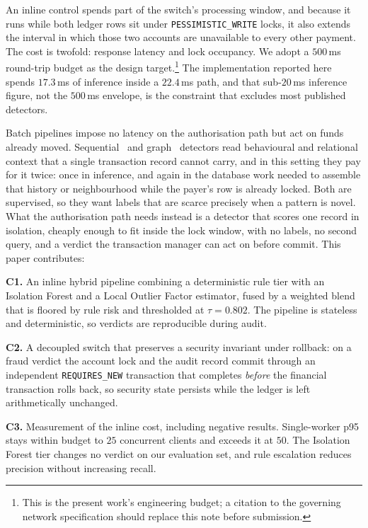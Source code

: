 \documentclass[conference]{IEEEtran}
\begin{document}
An inline control spends part of the switch's processing window, and
because it runs while both ledger rows sit under
\texttt{PESSIMISTIC\_WRITE} locks, it also extends the interval in
which those two accounts are unavailable to every other payment. The
cost is twofold: response latency and lock occupancy. We adopt a
$500$\,ms round-trip budget as the design
target.\footnote{This is the present work's engineering
budget; a citation to the governing network specification should
replace this note before submission.} The implementation reported here
spends $17.3$\,ms of inference inside a $22.4$\,ms path, and that
sub-$20$\,ms inference figure, not the $500$\,ms envelope, is the
constraint that excludes most published detectors.

Batch pipelines impose no latency on the authorisation path but act on
funds already moved. Sequential~\cite{jurgovsky2018} and
graph~\cite{dou2020} detectors read behavioural and relational context
that a single transaction record cannot carry, and in this setting they
pay for it twice: once in inference, and again in the database work
needed to assemble that history or neighbourhood while the payer's row
is already locked. Both are supervised, so they want labels that are
scarce precisely when a pattern is novel. What the authorisation path
needs instead is a detector that scores one record in isolation,
cheaply enough to fit inside the lock window, with no labels, no second
query, and a verdict the transaction manager can act on before commit.
This paper contributes:

\textbf{C1.} An inline hybrid pipeline combining a deterministic rule
tier with an Isolation Forest and a Local Outlier Factor estimator,
fused by a weighted blend that is floored by rule risk and thresholded
at $\tau=0.802$. The pipeline is stateless and deterministic, so
verdicts are reproducible during audit.

\textbf{C2.} A decoupled switch that preserves a security invariant
under rollback: on a fraud verdict the account lock and the audit
record commit through an independent \texttt{REQUIRES\_NEW} transaction
that completes \emph{before} the financial transaction rolls back, so
security state persists while the ledger is left arithmetically
unchanged.

\textbf{C3.} Measurement of the inline cost, including negative
results. Single-worker p95 stays within budget to $25$ concurrent
clients and exceeds it at $50$. The Isolation Forest tier changes no
verdict on our evaluation set, and rule escalation reduces precision
without increasing recall.
\end{document}
